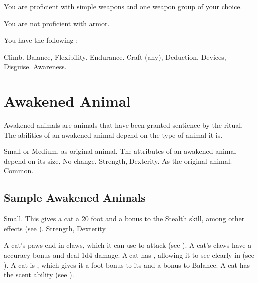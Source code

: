        You are proficient with simple weapons and one weapon group of your choice.

        You are not proficient with armor.

        You have the following :
        \begin{itemize}
             Climb.
             Balance, Flexibility.
             Endurance.
             Craft (any), Deduction, Devices, Disguise.
             Awareness.
        \end{itemize}

\section{Awakened Animal}

    Awakened animals are animals that have been granted sentience by the  ritual.
    The abilities of an awakened animal depend on the type of animal it is.

     Small or Medium, as original animal.
     The attributes of an awakened animal depend on its size.
     No change.
      Strength,  Dexterity.
     As the original animal.
     Common.

    \subsection{Sample Awakened Animals}


         Small. This gives a cat a 20 foot  and a  bonus to the Stealth skill, among other effects (see ).
          Strength,  Dexterity
        \begin{itemize}
             A cat's paws end in claws, which it can use to attack (see ). A cat's claws have a  accuracy bonus and deal 1d4 damage.
             A cat has , allowing it to see clearly in  (see ).
             A cat is , which gives it a  foot bonus to its  and a  bonus to Balance.
             A cat has the scent ability (see ).
        \end{itemize}

